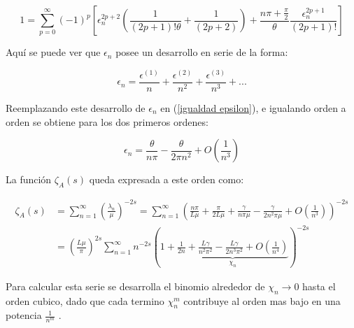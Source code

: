 \begin{equation}
    1 = 
    \sum _{p=0} ^{\infty} (-1) ^p     \left[
   	\epsilon _n ^{2p+2 }\left( \frac{1}{(2p+1)! \theta } + \frac{1}{(2p+2)} \right) +
  	\frac{n \pi + \frac{\pi}{2}}{\theta} \frac{  \epsilon _n ^{2p+1}}{(2p+1)!} 			\right]
\label{igualdad epsilon}
\end{equation}

Aquí se puede ver que  $\epsilon _n $ posee un desarrollo en serie de la forma:

\begin{equation}
    \epsilon _n = 
    \frac{\epsilon ^{(1)}}{n}  + 
    \frac{\epsilon ^{(2)}}{n ^2}  + 
    \frac{\epsilon ^{(3)}}{n ^3}  + ...
\label{eq.epsilon}
\end{equation}


Reemplazando este desarrollo de $\epsilon _n$ en (\ref{igualdad epsilon}), e igualando orden a orden se obtiene para los dos primeros ordenes:

\begin{equation}
    \epsilon _n = \frac{\theta}{n \pi} 
     - \frac{ \theta}{2 \pi n ^2 } + O \left( \frac{1}{n ^3}\right) 
\label{epsilons}
\end{equation}

\newpage


La función $ \zeta _A (s)$ queda expresada a este orden como:
    
\begin{equation}
\begin{aligned}
    \zeta _{A} (s) &=  
    \sum _{n=1} ^{\infty} 
    \left( \frac{\lambda _n }{\mu} 
    	\right) ^ {-2 s}  =
    \sum _{n=1} ^{\infty} 
    \left(
	\frac{n \pi}{L \mu} + 
    \frac{\pi}{2 L \mu} +
    \frac{\gamma}{n \pi \mu } -
    \frac{\gamma}{2 n ^2 \pi \mu } +
    O \left(  \frac{1}{n^3} \right) 
    \right) ^{-2 s}  \\[5pt]
    &= \left( \frac{L \mu }{\pi} \right) ^{2s}    
    \sum _{n=1} ^{\infty} 
    n ^{- 2 s} 
    \left(
    1 +     
    \underbrace{
        \frac{1}{2 n} + 
        \frac{L \gamma}{n^2 \pi ^2} -
        \frac{L \gamma}{2 n ^3 \pi ^2} +
        O \left( \frac{1}{n ^{4}} \right) } _{ \chi _n}
    \right ) ^{-2 s}
\end{aligned}
\end{equation}

Para calcular esta serie se desarrolla el binomio alrededor de $\chi _n \rightarrow{0} $ hasta el orden cubico, dado que  cada termino $\chi _{n} ^{m} $ contribuye al orden mas bajo en una potencia $\frac{1}{n ^m}$ .


